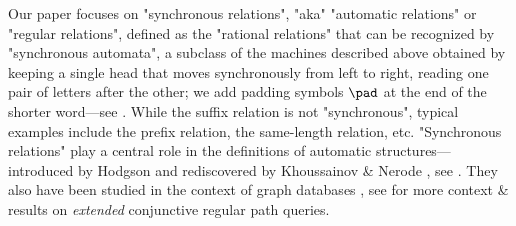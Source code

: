 Our paper focuses on "synchronous relations", "aka" "automatic relations" or "regular relations", defined as the "rational relations" that can be recognized by
"synchronous automata",
a subclass of the machines described above obtained by keeping a single head that
moves synchronously from left to right, reading one pair of letters after the other; we add
padding symbols $\pad$ at the end of the shorter word---see
.
While the suffix relation is not "synchronous", typical examples include the prefix relation,
the same-length relation, etc.
"Synchronous relations" play a central role in the
definitions of automatic structures---introduced by Hodgson \cite{hodgson_theories_1976,hodgson_direct_1982,hodgson_decidabilite_1983} and rediscovered by Khoussainov \& Nerode \cite{goos_automatic_1995}, see \cite[\S XI, pp.~627--762]{blumensath_monadic_2023}.
They also have been studied in the context of graph databases \cite[Definition 3.1, p.7 \& Theorem 6.3, p.~13]{barcelo_expressive_2012}, see \cite[\S 8, p.~17]{figueira_foundations_2021} for more context \& results on \emph{extended} conjunctive regular path queries.

